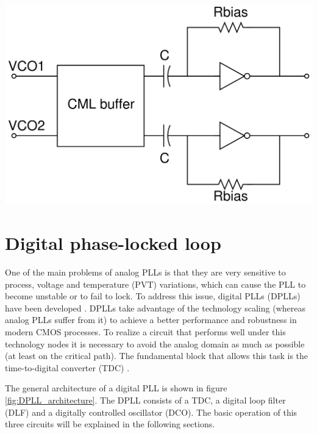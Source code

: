 \begin{center}
    \includegraphics[width=1\textwidth]{figures/CML2CMOS.png}
    \label{fig:CML2CMOS}
\end{center}

\section{Digital phase-locked loop}
One of the main problems of analog PLLs is that they are very sensitive to process, voltage and temperature (PVT) variations, which can cause the PLL to become unstable or to fail to lock.
To address this issue, digital PLLs (DPLLs) have been developed \cite{Yuncheng2024}. DPLLs take advantage of the technology scaling (whereas analog PLLs suffer from it) to achieve a better performance
and robustness in modern CMOS processes. To realize a circuit that performs well under this technology nodes it is necessary to avoid the analog domain as much as possible (at least on
the critical path). The fundamental block that allows this task is the time-to-digital converter (TDC) \cite{Henzler2010}.

The general architecture of a digital PLL is shown in figure \ref{fig:DPLL_architecture}. The DPLL consists of a TDC, a digital loop filter (DLF) and a digitally controlled oscillator (DCO).
The basic operation of this three circuits will be explained in the following sections.

